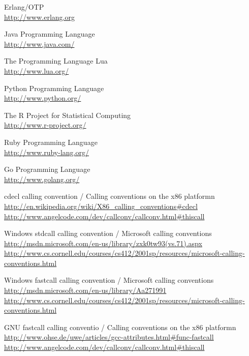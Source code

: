 \begin{thebibliography}{14}
	Erlang/OTP\\
	\url{http://www.erlang.org}

	Java Programming Language\\
	\url{http://www.java.com/}

	The Programming Language Lua\\
	\url{http://www.lua.org/}

	Python Programming Language\\
	\url{http://www.python.org/}

	The R Project for Statistical Computing\\
	\url{http://www.r-project.org/}

	Ruby Programming Language\\
	\url{http://www.ruby-lang.org/}

	Go Programming Language\\
	\url{http://www.golang.org/}

	cdecl calling convention / Calling conventions on the x86 platformn\\
	\url{http://en.wikipedia.org/wiki/X86\_calling\_conventions#cdecl}\\
	\url{http://www.angelcode.com/dev/callconv/callconv.html#thiscall}

	Windows stdcall calling convention / Microsoft calling conventions\\
	\url{http://msdn.microsoft.com/en-us/library/zxk0tw93(vs.71).aspx}\\
	\url{http://www.cs.cornell.edu/courses/cs412/2001sp/resources/microsoft-calling-conventions.html}

	Windows fastcall calling convention / Microsoft calling conventions\\
	\url{http://msdn.microsoft.com/en-us/library/Aa271991}\\
	\url{http://www.cs.cornell.edu/courses/cs412/2001sp/resources/microsoft-calling-conventions.html}

	GNU fastcall calling conventio / Calling conventions on the x86 platformn\\
	\url{http://www.ohse.de/uwe/articles/gcc-attributes.html#func-fastcall}\\
	\url{http://www.angelcode.com/dev/callconv/callconv.html#thiscall}


\end{thebibliography}
